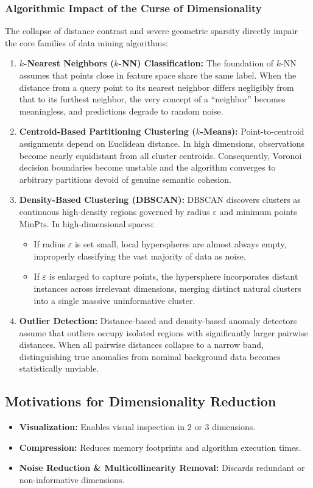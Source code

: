 \subsubsection{Algorithmic Impact of the Curse of Dimensionality}
The collapse of distance contrast and severe geometric sparsity directly impair the core families of data mining algorithms:
\begin{enumerate}
    \item \textbf{$k$-Nearest Neighbors ($k$-NN) Classification:} The foundation of $k$-NN assumes that points close in feature space share the same label. When the distance from a query point to its nearest neighbor differs negligibly from that to its furthest neighbor, the very concept of a ``neighbor'' becomes meaningless, and predictions degrade to random noise.
    \item \textbf{Centroid-Based Partitioning Clustering ($k$-Means):} Point-to-centroid assignments depend on Euclidean distance. In high dimensions, observations become nearly equidistant from all cluster centroids. Consequently, Voronoi decision boundaries become unstable and the algorithm converges to arbitrary partitions devoid of genuine semantic cohesion.
    \item \textbf{Density-Based Clustering (DBSCAN):} DBSCAN discovers clusters as continuous high-density regions governed by radius $\varepsilon$ and minimum points $\text{MinPts}$. In high-dimensional spaces:
    \begin{itemize}
        \item If radius $\varepsilon$ is set small, local hyperspheres are almost always empty, improperly classifying the vast majority of data as noise.
        \item If $\varepsilon$ is enlarged to capture points, the hypersphere incorporates distant instances across irrelevant dimensions, merging distinct natural clusters into a single massive uninformative cluster.
    \end{itemize}
    \item \textbf{Outlier Detection:} Distance-based and density-based anomaly detectors assume that outliers occupy isolated regions with significantly larger pairwise distances. When all pairwise distances collapse to a narrow band, distinguishing true anomalies from nominal background data becomes statistically unviable.
\end{enumerate}

\subsection{Motivations for Dimensionality Reduction}
\begin{itemize}
    \item \textbf{Visualization:} Enables visual inspection in $2$ or $3$ dimensions.
    \item \textbf{Compression:} Reduces memory footprints and algorithm execution times.
    \item \textbf{Noise Reduction \& Multicollinearity Removal:} Discards redundant or non-informative dimensions.
\end{itemize}

